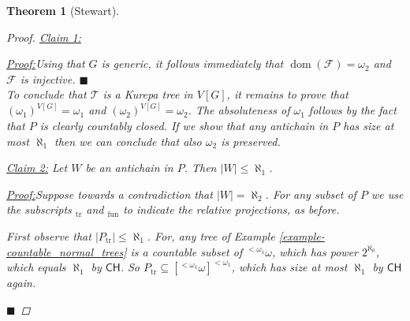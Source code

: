 \documentclass[11pt,a4paper]{report}
\newtheorem{theorem}{Theorem}[chapter] %
\theoremstyle{definition}
\theoremstyle{num.custom-title}
\theoremstyle{custom-title}
\newenvironment{claim}[1]{\par\noindent\underline{Claim#1:}\space}{} %
\newenvironment{claimproof}[1]{\par\noindent\underline{Proof:}\space#1}{\leavevmode\unskip\penalty9999 \hbox{}\nobreak\hfill\quad\hbox{$\blacksquare$}} %
\DeclareMathOperator{\dom}{dom}
\DeclareMathOperator{\sse}{\subseteq}
\newcommand{\CH}{\ensuremath{\mathsf{CH}}\xspace}
\newcommand{\F}{\mathcal{F}}
\newcommand{\T}{\mathcal{T}}
\begin{document}
\begin{theorem}[Stewart]
\begin{proof}
\begin{claim}{ 1}
\begin{claimproof}
Using that $G$ is generic, it follows immediately that $\dom(\F) = \omega_2$ and $\F$ is injective.
\end{claimproof}
\end{claim}
\\[6pt]
\indent To conclude that $\T$ is a Kurepa tree in $V[G]$, it remains to prove that $(\omega_1)^{V[G]} = \omega_1$ and $(\omega_2)^{V[G]} = \omega_2$. The absoluteness of $\omega_1$ follows by the fact that $P$ is clearly countably closed. If we show that any antichain in $P$ has size at most $\aleph_1$ then we can conclude that also $\omega_2$ is preserved.\\[-10pt]
\begin{claim}{ 2}
Let $W$ be an antichain in $P$. Then $|W| \leq \aleph_1$.
\begin{claimproof}
Suppose towards a contradiction that $|W| = \aleph_2$. For any subset of $P$ we use the subscripts $_{\text{tr}}$ and $_{\text{fun}}$ to indicate the relative projections, as before.

First observe that $|P_{\text{tr}}| \leq \aleph_1$. For, any tree of Example \ref{example-countable_normal_trees} is a countable subset of $^{< \omega_1} \omega$, which has power $2^{\aleph_0}$, which equals $\aleph_1$ by \CH. So $P_{\text{tr}} \sse [{^{< \omega_1}} \omega]^{<\omega_1}$, which has size at most $\aleph_1$ by \CH again.


\end{claimproof}
\end{claim}
\end{proof}
\end{theorem}
\end{document}

